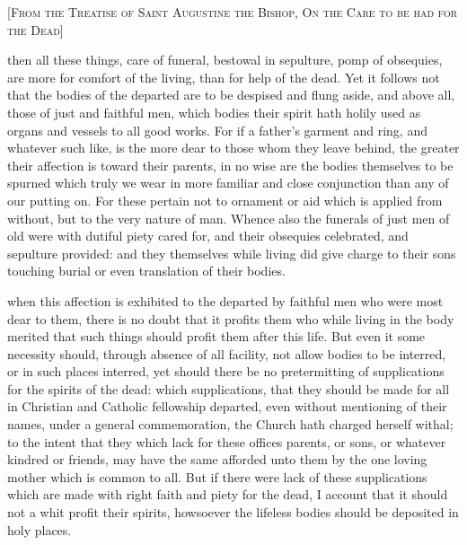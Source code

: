 \begin{center}
	\textsc{[From the Treatise of Saint Augustine the Bishop, On the Care to be had for the Dead]}
\end{center}

 then all these things, care of funeral, bestowal in sepulture, pomp of obsequies, are more for comfort of the living, than for help of the dead. Yet it follows not that the bodies of the departed are to be despised and flung aside, and above all, those of just and faithful men, which bodies their spirit hath holily used as organs and vessels to all good works. For if a father's garment and ring, and whatever such like, is the more dear to those whom they leave behind, the greater their affection is toward their parents, in no wise are the bodies themselves to be spurned which truly we wear in more familiar and close conjunction than any of our putting on. For these pertain not to ornament or aid which is applied from without, but to the very nature of man. Whence also the funerals of just men of old were with dutiful piety cared for, and their obsequies celebrated, and sepulture provided: and they themselves while living did give charge to their sons touching burial or even translation of their bodies.

 when this affection is exhibited to the departed by faithful men who were most dear to them, there is no doubt that it profits them who while living in the body merited that such things should profit them after this life. But even it some necessity should, through absence of all facility, not allow bodies to be interred, or in such places interred, yet should there be no pretermitting of supplications for the spirits of the dead: which supplications, that they should be made for all in Christian and Catholic fellowship departed, even without mentioning of their names, under a general commemoration, the Church hath charged herself withal; to the intent that they which lack for these offices parents, or sons, or whatever kindred or friends, may have the same afforded unto them by the one loving mother which is common to all. But if there were lack of these supplications which are made with right faith and piety for the dead, I account that it should not a whit profit their spirits, howsoever the lifeless bodies should be deposited in holy places.

